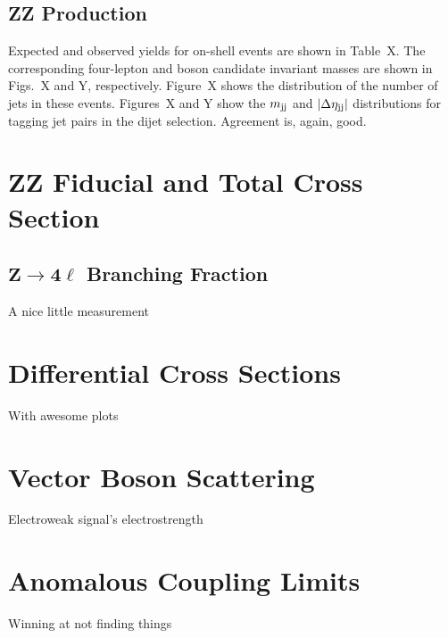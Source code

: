 \subsection{ZZ Production}

Expected and observed yields for on-shell {\ZZ} events are shown in Table~X.
The corresponding four-lepton and {\PZ} boson candidate invariant masses are shown in Figs.~X and Y, respectively.
Figure~X shows the distribution of the number of jets in these events.
Figures~X and Y show the $m_{\mathrm{j}\mathrm{j}}$ and $\lvert \Delta \eta_{\mathrm{j}\mathrm{j}} \rvert$ distributions for tagging jet pairs in the dijet selection.
Agreement is, again, good.



\section{ZZ Fiducial and Total Cross Section}




\subsection[\texorpdfstring{$\mathrm{Z} \to 4\ell$}{Z to 4l} Branching  Fraction]{$\mathbf{Z} \to \mathbf{4\ell}$ Branching  Fraction}
A nice little measurement



\section{Differential Cross Sections}
With awesome plots



\section{Vector Boson Scattering}
Electroweak signal's electrostrength



\section{Anomalous Coupling Limits}
Winning at not finding things

